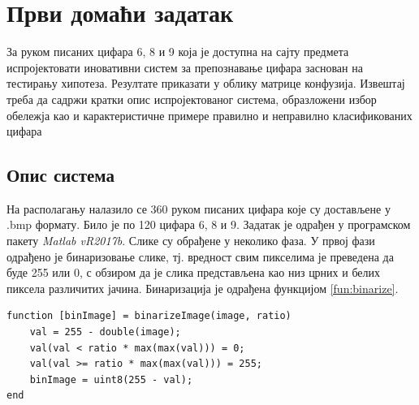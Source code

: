 

\section{Први домаћи задатак}
За руком писаних цифара 6, 8 и 9 која је доступна на сајту предмета испројектовати иновативни систем за препознавање цифара заснован на тестирању хипотеза. Резултате приказати у облику матрице конфузија. Извештај треба да садржи кратки опис испројектованог система, образложени избор обележја као и карактеристичне примере правилно и неправилно класификованих цифара
\subsection{Опис система}
На располагању налазило се 360 руком писаних цифара које су достављене у .bmp формату. Било је по 120 цифара 6, 8 и 9. Задатак је одрађен у програмском пакету \emph{Matlab vR2017b}.  Слике су обрађене у неколико фаза. 
	У првој фази одрађено је бинаризовање слике, тј. вредност свим пикселима је преведена да буде 255 или 0, с обзиром да је слика представљена као низ црних и белих пиксела различитих јачина. Бинаризација је одрађена функцијом \ref{fun:binarize}.
	
	

\renewcommand{\lstlistingname}{Одсечак кода}%
	
\begin{lstlisting}[caption={Бинаризација слике},label={fun:binarize}]
function [binImage] = binarizeImage(image, ratio)
    val = 255 - double(image);
    val(val < ratio * max(max(val))) = 0;
    val(val >= ratio * max(max(val))) = 255;
    binImage = uint8(255 - val);
end

\end{lstlisting}

